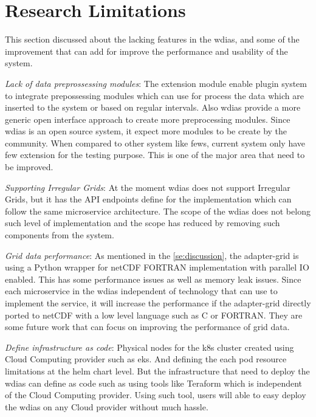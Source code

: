 \section{Research Limitations}
This section discussed about the lacking features in the \acrshort{wdias}, and some of the improvement that can add for improve the performance and usability of the system.

\emph{Lack of data preprossessing modules}:
The extension module enable plugin system to integrate prepossessing modules which can use for process the data which are inserted to the system or based on regular intervals. Also \acrshort{wdias} provide a more generic open interface approach to create more preprocessing modules. Since \acrshort{wdias} is an open source system, it expect more modules to be create by the community. When compared to other system like \acrshort{fews}, current system only have few extension for the testing purpose. This is one of the major area that need to be improved.

\emph{Supporting Irregular Grids}:
At the moment \acrshort{wdias} does not support Irregular Grids, but it has the API endpoints define for the implementation which can follow the same microservice architecture. The scope of the \acrshort{wdias} does not belong such level of implementation and the scope has reduced by removing such components from the system.

\emph{Grid data performance}:
As mentioned in the \cref{se:discussion}, the adapter-grid is using a Python wrapper for netCDF FORTRAN implementation with parallel IO enabled. This has some performance issues as well as memory leak issues. Since each microservice in the \acrshort{wdias} independent of technology that can use to implement the service, it will increase the performance if the adapter-grid directly ported to netCDF with a low level language such as C or FORTRAN. They are some future work that can focus on improving the performance of grid data.

\emph{Define infrastructure as code}:
Physical nodes for the \acrshort{k8s} cluster created using Cloud Computing provider such as \acrshort{eks}. And defining the each pod resource limitations at the helm chart level. But the infrastructure that need to deploy the \acrshort{wdias} can define as code such as using tools like Teraform which is independent of the Cloud Computing provider. Using such tool, users will able to easy deploy the \acrshort{wdias} on any Cloud provider without much hassle.


